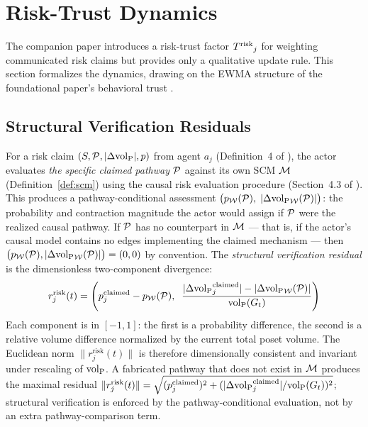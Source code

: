 \section{Risk-Trust Dynamics}
\label{sec:risk_trust}

The companion paper \citep{lasser2026horizon} introduces a risk-trust factor
${T^{\mathrm{risk}}}_j$ for weighting communicated risk claims but provides only a
qualitative update rule. This section formalizes the dynamics, drawing on the
EWMA structure of the foundational paper's behavioral trust
\citep{lasser2026gfm}.

\subsection{Structural Verification Residuals}

\begin{definition}
\label{def:risk_residual}
For a risk claim $(S, \mathcal{P}, |\Delta {\operatorname{vol}_{\mathrm{P}}}|, p)$ from agent $a_j$
    (Definition~4 of \citet{lasser2026horizon}), the actor evaluates
    \emph{the specific claimed pathway} $\mathcal{P}$ against its own SCM
    $\mathcal{M}$ (Definition~\ref{def:scm}) using the causal risk evaluation
    procedure (Section~4.3 of \citet{lasser2026horizon}). This produces
    a pathway-conditional assessment
    $\bigl(p_{\mathcal{W}}(\mathcal{P}),\;
    |\Delta {\operatorname{vol}_{\mathrm{P}}}_{\mathcal{W}}(\mathcal{P})|\bigr)$: the probability and
    contraction magnitude the actor would assign if $\mathcal{P}$ were
    the realized causal pathway. If $\mathcal{P}$ has no counterpart in
    $\mathcal{M}$ --- that is, if the actor's causal model contains no edges
    implementing the claimed mechanism --- then
    $\bigl(p_{\mathcal{W}}(\mathcal{P}), |\Delta {\operatorname{vol}_{\mathrm{P}}}_{\mathcal{W}}(\mathcal{P})|\bigr)
    = (0, 0)$ by convention. The \emph{structural verification
    residual} is the dimensionless two-component divergence:
\begin{equation}
\label{eq:risk_residual}
r_j^{\mathrm{risk}}(t) = \left(
    p_j^{\mathrm{claimed}} - p_{\mathcal{W}}(\mathcal{P}),\;\;
    \frac{|\Delta {\operatorname{vol}_{\mathrm{P}}}_j^{\mathrm{claimed}}| -
          |\Delta {\operatorname{vol}_{\mathrm{P}}}_{\mathcal{W}}(\mathcal{P})|}{{\operatorname{vol}_{\mathrm{P}}}(G_t)}
\right)
\end{equation}
Each component is in $[-1, 1]$: the first is a probability difference,
    the second is a relative volume difference normalized by the
    current total poset volume. The Euclidean norm
    $\|r_j^{\mathrm{risk}}(t)\|$ is therefore dimensionally consistent
    and invariant under rescaling of ${\operatorname{vol}_{\mathrm{P}}}$. A fabricated pathway
    that does not exist in $\mathcal{M}$ produces the maximal residual
    $\|r_j^{\mathrm{risk}}(t)\| = \sqrt{(p_j^{\mathrm{claimed}})^2
    + (|\Delta {\operatorname{vol}_{\mathrm{P}}}_j^{\mathrm{claimed}}|/{\operatorname{vol}_{\mathrm{P}}}(G_t))^2}$; structural
    verification is enforced by the pathway-conditional evaluation,
    not by an extra pathway-comparison term.
\end{definition}

